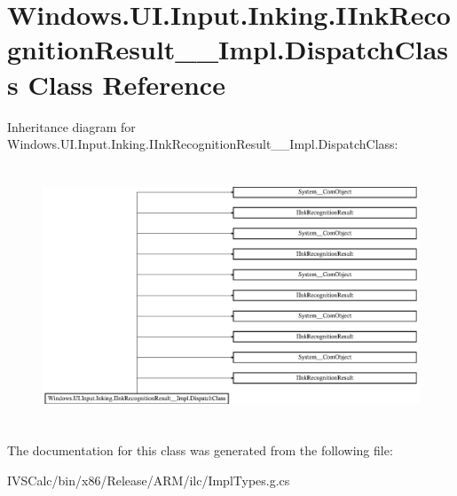 \hypertarget{class_windows_1_1_u_i_1_1_input_1_1_inking_1_1_i_ink_recognition_result_____impl_1_1_dispatch_class}{}\section{Windows.\+U\+I.\+Input.\+Inking.\+I\+Ink\+Recognition\+Result\+\_\+\+\_\+\+Impl.\+Dispatch\+Class Class Reference}
\label{class_windows_1_1_u_i_1_1_input_1_1_inking_1_1_i_ink_recognition_result_____impl_1_1_dispatch_class}
Inheritance diagram for Windows.\+U\+I.\+Input.\+Inking.\+I\+Ink\+Recognition\+Result\+\_\+\+\_\+\+Impl.\+Dispatch\+Class\+:\begin{figure}[H]
\begin{center}
\leavevmode
\includegraphics[height=7.777778cm]{class_windows_1_1_u_i_1_1_input_1_1_inking_1_1_i_ink_recognition_result_____impl_1_1_dispatch_class}
\end{center}
\end{figure}


The documentation for this class was generated from the following file\+:\begin{DoxyCompactItemize}
\item 
I\+V\+S\+Calc/bin/x86/\+Release/\+A\+R\+M/ilc/Impl\+Types.\+g.\+cs\end{DoxyCompactItemize}
